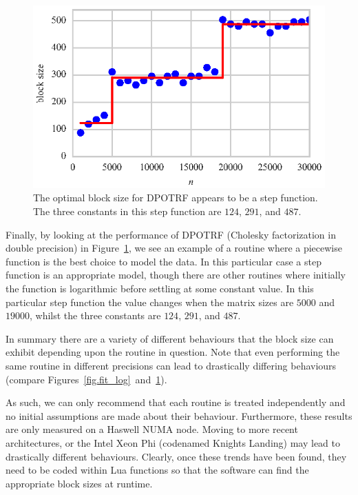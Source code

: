 \documentclass[a4paper,12pt]{article}
\begin{document}
\begin{figure}[ht]
  \centering
  \includegraphics[scale=1]{fig/curvefit_step.eps}
  \caption{The optimal block size for DPOTRF appears to
    be a step function. The three constants in this step function
    are $124$, $291$, and $487$.}
  \label{fig.fit_step}
\end{figure}
Finally,
by looking at the performance of DPOTRF
(Cholesky factorization in double precision)
in Figure~\ref{fig.fit_step},
we see an example of a routine
where a piecewise function is
the best choice to model the data.
In this particular case a step function is
an appropriate model,
though there are other routines where
initially the function is logarithmic before
settling at some constant value.
In this particular step function the value changes
when the matrix sizes are $5000$ and $19000$,
whilst the three constants are $124$, $291$, and $487$.

In summary there are a variety of different behaviours that
the block size can exhibit depending upon the
routine in question.
Note that even performing the same routine in different
precisions can lead to drastically differing behaviours
(compare Figures~\ref{fig.fit_log}~and~\ref{fig.fit_step}).

As such,
we can only recommend that each routine is treated
independently and no initial assumptions are
made about their behaviour.
Furthermore,
these results are only measured on a Haswell NUMA node.
Moving to more recent architectures,
or the Intel Xeon Phi (codenamed Knights Landing)
may lead to drastically different behaviours.
Clearly,
once these trends have been found,
they need to be coded within Lua functions so that the
software can find the appropriate block sizes at runtime.
\end{document}
